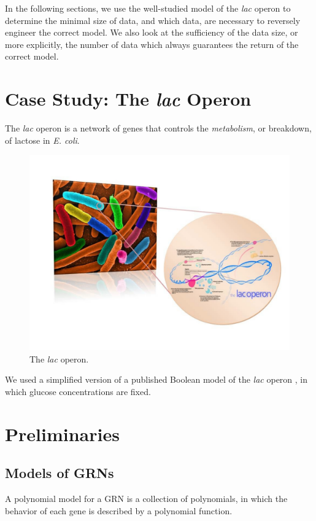 \documentclass{amsart}
\theoremstyle{definition}
\theoremstyle{remark}
\theoremstyle{example}
\theoremstyle{conjecture}
\numberwithin{equation}{section}
\newcommand{\lac}{\textit{lac }}
\begin{document}
In the following sections, we use the well-studied model of the \textit{lac} operon to determine the minimal size of data, and which data, are necessary to reversely engineer the correct model. We also look at the sufficiency of the data size, or more explicitly, the number of data which always guarantees the return of the correct model.

\section{Case Study: The \lac Operon}

The \lac operon is a network of genes that controls the
\textit{metabolism}, or breakdown, of lactose in \textit{E. coli}.

\begin{figure}
 \centering
    \includegraphics[scale=0.4]{lac.pdf}
  \caption{The \lac operon.}\label{}
\end{figure}

We used a simplified version of a published Boolean model of the
\lac operon \cite{veliz}, in which glucose concentrations are fixed.

\section{Preliminaries}
\subsection{Models of GRNs}
\label{sec-models}

A polynomial model for a GRN is a collection of polynomials, in
which the behavior of each gene is described by a polynomial
function.
\end{document}
